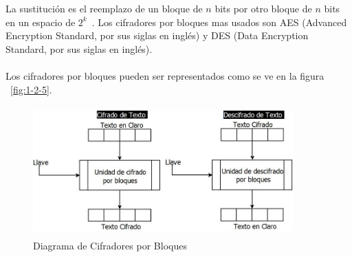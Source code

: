 La sustitución es el reemplazo de un bloque de $n$ bits por otro bloque de $n$ bits en un espacio de 
$2^{k}$~\cite{bloc}. Los cifradores por bloques mas usados son AES (Advanced Encryption Standard, por sus 
siglas en ingl\'es) y DES (Data Encryption Standard, por sus siglas en ingl\'es). ~\cite{bloques}\\ \\ 

Los cifradores por bloques pueden ser representados como se ve en la figura ~\ref{fig:1-2-5}.

\begin{figure}[H]
\centering
	\includegraphics[width=10cm, height=5cm]{./images/CifradoBloques.jpeg}
	\caption{Diagrama de Cifradores por Bloques}
	\label{fig:2-4-1}
\end{figure}





